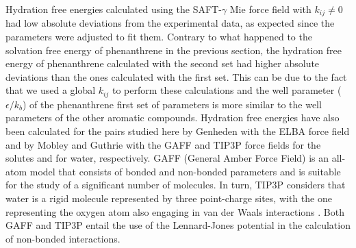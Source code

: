 \documentclass[preprint]{elsarticle}
\begin{document}
	Hydration free energies calculated using the SAFT-$\gamma$ Mie force field with $k_{ij} \neq 0$ had low absolute deviations from the experimental data, as expected since the parameters were adjusted to fit them. Contrary to what happened to the solvation free energy of phenanthrene in the previous section, the hydration free energy of phenanthrene calculated with the second set  had higher absolute deviations than the ones calculated with the first set. This can be due to the fact that we used a global $k_{ij}$ to perform these calculations and the well parameter ($\epsilon / k_b$) of the phenanthrene first set of parameters is more similar to the well parameters of the other aromatic compounds. 	Hydration free energies have also been calculated for the pairs studied here by Genheden \cite{doi:10.1021/acs.jctc.5b00963} with the ELBA force field and by Mobley and Guthrie \cite{PMID:24928188} with the GAFF and TIP3P force fields for the solutes and for water, respectively.
	GAFF (General Amber Force Field) is an all-atom model that consists of bonded and non-bonded parameters and is suitable for the study of a significant number of molecules.
	In turn, TIP3P considers that water is a rigid molecule represented by three point-charge sites, with the one representing the oxygen atom also engaging in van der Waals interactions \cite{doi:10.1063/1.445869}.
	Both GAFF and TIP3P entail the use of the Lennard-Jones potential in the calculation of non-bonded interactions.
	
\end{document}
